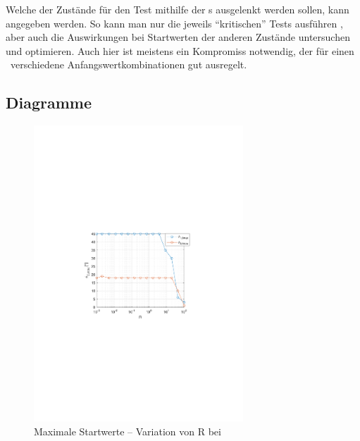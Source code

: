 Welche der Zustände für den Test mithilfe der \xots s ausgelenkt werden sollen, kann angegeben werden.
So kann man nur die jeweils "`kritischen"' Tests ausführen , aber auch die Auswirkungen bei Startwerten der anderen Zustände untersuchen und optimieren.
Auch hier ist meistens ein Kompromiss notwendig, der für einen \ap\ verschiedene Anfangswertkombinationen gut ausregelt.


\subsection{Diagramme}

\begin{figure}[htb]
	\centering
		\includegraphics[width=0.7\textwidth]{Bilder/QRVariation/ap2/R phi12.pdf}
	\caption{Maximale Startwerte -- Variation von R bei \apz}
	\label{fig:qrap2R}
\end{figure}

